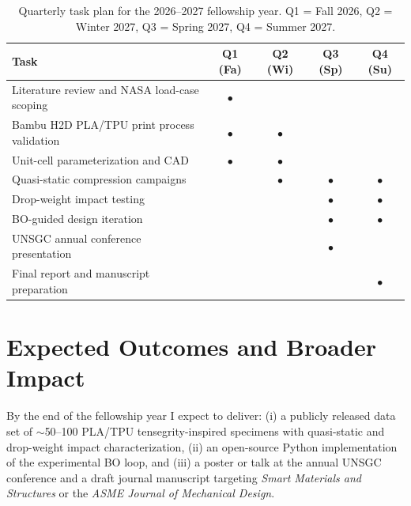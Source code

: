 \documentclass[11pt]{article}
\begin{document}
\begin{table}[ht]
\centering
\small
\begin{tabular}{@{}lcccc@{}}
\toprule
\textbf{Task} & \textbf{Q1 (Fa)} & \textbf{Q2 (Wi)} & \textbf{Q3 (Sp)} & \textbf{Q4 (Su)} \\
\midrule
Literature review and NASA load-case scoping     & \(\bullet\) &           &           &           \\
Bambu H2D PLA/TPU print process validation       & \(\bullet\) & \(\bullet\) &           &           \\
Unit-cell parameterization and CAD               & \(\bullet\) & \(\bullet\) &           &           \\
Quasi-static compression campaigns               &           & \(\bullet\) & \(\bullet\) & \(\bullet\) \\
Drop-weight impact testing                       &           &           & \(\bullet\) & \(\bullet\) \\
BO-guided design iteration                       &           &           & \(\bullet\) & \(\bullet\) \\
UNSGC annual conference presentation             &           &           & \(\bullet\) &           \\
Final report and manuscript preparation          &           &           &           & \(\bullet\) \\
\bottomrule
\end{tabular}
\caption{Quarterly task plan for the 2026--2027 fellowship year.  Q1 = Fall 2026,
Q2 = Winter 2027, Q3 = Spring 2027, Q4 = Summer 2027.}
\label{tab:tasks}
\end{table}

\section{Expected Outcomes and Broader Impact}

By the end of the fellowship year I expect to deliver:
(i) a publicly released data set of $\sim$50--100 PLA/TPU tensegrity-inspired
specimens with quasi-static and drop-weight impact characterization,
(ii) an open-source Python implementation of the experimental BO loop, and
(iii) a poster or talk at the annual UNSGC conference and a draft journal
manuscript targeting
\emph{Smart Materials and Structures} or the \emph{ASME Journal of Mechanical
Design}.
\end{document}
